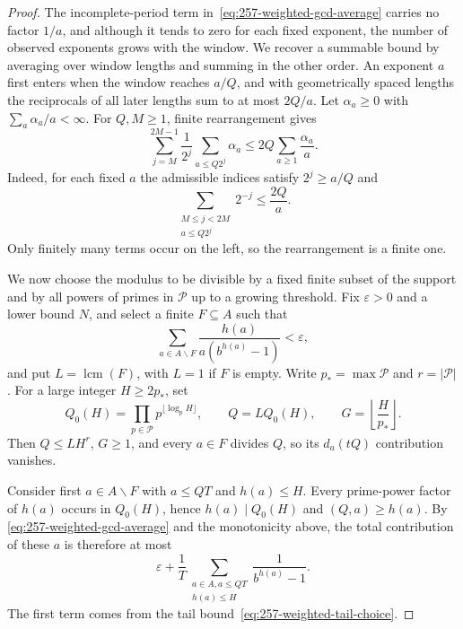 \begin{proof}
The incomplete-period term in~\eqref{eq:257-weighted-gcd-average}
carries no factor $1/a$, and although it tends to zero for each fixed
exponent, the number of observed exponents grows with the window. We
recover a summable bound by averaging over window lengths and summing in
the other order. An exponent $a$ first enters when the window reaches
$a/Q$, and with geometrically spaced lengths the reciprocals of all later
lengths sum to at most $2Q/a$. Let $\alpha_a\ge0$ with
$\sum_a\alpha_a/a<\infty$. For $Q,M\ge1$, finite rearrangement gives
\begin{equation}\label{eq:257-weighted-dyadic-average}
 \sum_{j=M}^{2M-1}\frac1{2^j}
       \sum_{a\le Q2^j}\alpha_a
 \le 2Q\sum_{a\ge1}\frac{\alpha_a}{a}.
\end{equation}
Indeed, for each fixed $a$ the admissible indices satisfy $2^j\ge a/Q$ and
\[
 \sum_{\substack{M\le j<2M\\a\le Q2^j}}2^{-j}\le\frac{2Q}{a}.
\]
Only finitely many terms occur on the left, so the rearrangement is a
finite one.

We now choose the modulus to be divisible by a fixed finite subset
of the support and by all powers of primes in $\mathcal P$ up to a
growing threshold. Fix $\varepsilon>0$ and a lower bound $N$, and select
a finite $F\subseteq A$ such that
\begin{equation}\label{eq:257-weighted-tail-choice}
 \sum_{a\in A\mathbin{\backslash} F}
 \frac{h(a)}{a(b^{h(a)}-1)}<\varepsilon,
\end{equation}
and put $L=\operatorname{lcm}(F)$, with $L=1$ if $F$ is empty.  Write
$p_*=\max\mathcal P$ and $r=|\mathcal P|$.  For a large integer $H\ge2p_*$,
set
\[
 Q_0(H)=\prod_{p\in\mathcal P}p^{\lfloor\log_pH\rfloor},
 \qquad Q=LQ_0(H),
 \qquad G=\left\lfloor\frac H{p_*}\right\rfloor.
\]
Then $Q\le LH^r$, $G\ge1$, and every $a\in F$ divides $Q$, so its
$d_a(tQ)$ contribution vanishes.

Consider first $a\in A\mathbin{\backslash} F$ with $a\le QT$ and $h(a)\le H$.
Every prime-power factor of $h(a)$ occurs in $Q_0(H)$, hence
$h(a)\mid Q_0(H)$ and $(Q,a)\ge h(a)$. By
\eqref{eq:257-weighted-gcd-average} and the monotonicity above, the total
contribution of these $a$ is therefore at most
\begin{equation}\label{eq:257-weighted-small-part}
 \varepsilon+
 \frac1T\sum_{\substack{a\in A, a\le QT\\h(a)\le H}}
 \frac1{b^{h(a)}-1}.
\end{equation}
The first term comes from the tail bound~\eqref{eq:257-weighted-tail-choice}.


\end{proof}
